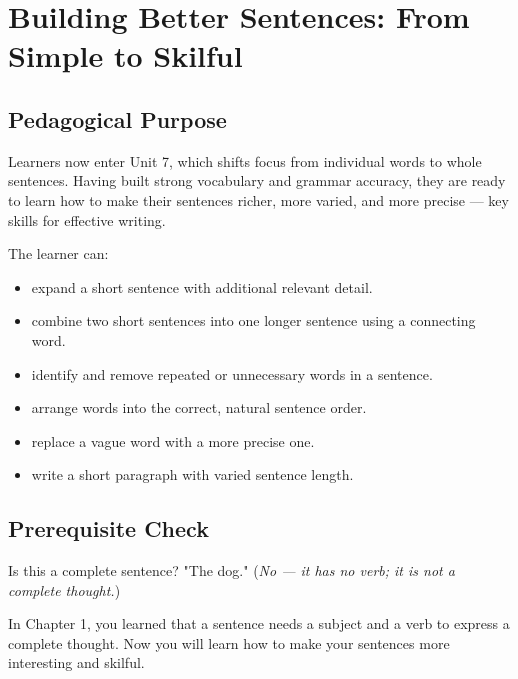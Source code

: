 
\chapter{Building Better Sentences: From Simple to Skilful}

\section{Pedagogical Purpose}
Learners now enter Unit 7, which shifts focus from individual words to whole sentences. Having built strong vocabulary and grammar accuracy, they are ready to learn how to make their sentences richer, more varied, and more precise — key skills for effective writing.

\begin{learningobjectives}
The learner can:
\begin{itemize}
    \item expand a short sentence with additional relevant detail.
    \item combine two short sentences into one longer sentence using a connecting word.
    \item identify and remove repeated or unnecessary words in a sentence.
    \item arrange words into the correct, natural sentence order.
    \item replace a vague word with a more precise one.
    \item write a short paragraph with varied sentence length.
\end{itemize}
\end{learningobjectives}

\section{Prerequisite Check}
\begin{quickcheck}
Is this a complete sentence? "The dog." (\textit{No — it has no verb; it is not a complete thought.})
\end{quickcheck}

\begin{rememberbox}
In Chapter 1, you learned that a sentence needs a subject and a verb to express a complete thought. Now you will learn how to make your sentences more interesting and skilful.
\end{rememberbox}

